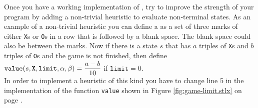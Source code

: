 Once you have a working implementation of , try to improve the strength of your program by
adding a non-trivial heuristic to evaluate non-terminal states.  As an example of a non-trivial heuristic you
can define a  as a set of three marks of either \texttt{X}s or \texttt{O}s in a row that is
followed by a blank space.  The blank space could also be between the marks.  Now if there is a state $s$ that
has $a$ triples of \texttt{X}s and $b$ triples of \texttt{O}s and the game is not finished, then define
\\[0.2cm]
\hspace*{1.3cm}
$\displaystyle \texttt{value}(s, \texttt{X}, \texttt{limit}, \alpha, \beta) = \frac{a - b}{10}$ \quad if $\texttt{limit} = 0$.
\\[0.2cm]
In order to implement a heuristic of this kind you have to change line 5 in the implementation of the
function \texttt{value} shown in Figure \ref{fig:game-limit.stlx} on page \pageref{fig:game-limit.stlx}.
\eox

